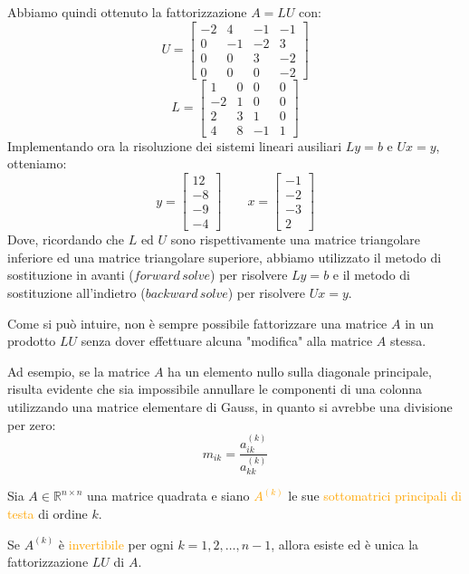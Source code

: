 \begin{example}
Abbiamo quindi ottenuto la fattorizzazione $A = LU$ con:
\[
U =
\begin{bmatrix}
-2 & 4 & -1 & -1 \\
0 & -1 & -2 & 3 \\
0 & 0 & 3 & -2 \\
0 & 0 & 0 & -2
\end{bmatrix}
\]
\[
L =
\begin{bmatrix}
1 & 0 & 0 & 0 \\
-2 & 1 & 0 & 0 \\
2 & 3 & 1 & 0 \\
4 & 8 & -1 & 1
\end{bmatrix}
\]
Implementando ora la risoluzione dei sistemi lineari ausiliari $Ly = b$ e $Ux = y$, otteniamo:
\[y =
\begin{bmatrix}12 \\
-8 \\
-9 \\
-4
\end{bmatrix}
\qquad
x = \begin{bmatrix}-1 \\
-2 \\
-3 \\
2
\end{bmatrix}
\]
Dove, ricordando che $L$ ed $U$ sono rispettivamente una matrice triangolare inferiore ed una matrice triangolare superiore,
abbiamo utilizzato il metodo di sostituzione in avanti ($forward \, solve$) per risolvere $Ly = b$ e il metodo di sostituzione 
all'indietro ($backward \, solve$) per risolvere $Ux = y$.
\end{example}


Come si può intuire, non è sempre possibile fattorizzare una matrice $A$ in un prodotto $LU$ senza dover effettuare alcuna "modifica" alla matrice $A$ stessa.

Ad esempio, se la matrice $A$ ha un elemento nullo sulla diagonale principale, risulta evidente che sia impossibile annullare le componenti di una colonna utilizzando una matrice elementare di Gauss, in quanto si avrebbe una divisione per zero:
\[m_{ik} = \frac{a_{ik}^{(k)}}{a_{kk}^{(k)}}\]

\begin{theorem}
    \label{teorema:esistenza_unicità_LU}
    Sia $A \in \mathbb{R}^{n \times n}$ una matrice quadrata e siano \textcolor{orange}{$A^{(k)}$} le sue \textcolor{orange}{sottomatrici principali di testa} di ordine $k$.

    Se $A^{(k)}$ è \textcolor{orange}{invertibile} per ogni $k = 1, 2, \ldots, n-1$, allora esiste ed è unica la fattorizzazione $LU$ di $A$.
\end{theorem}

